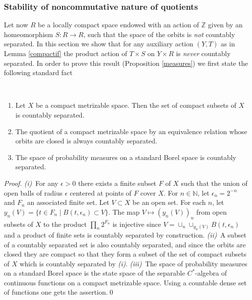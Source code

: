 \documentclass[graybox, envcountsect%
]{svmult}
\def\N{{\mathbb N}}
\def\Z{{\mathbb Z}}
\begin{document}
\subsubsection{Stability of noncommutative nature of quotients} \label{subsubsec:2.1.2}

Let now $R$ be a locally compact space endowed with an action of $\Z$ given by an homeomorphism $S:R\to R$, such that the space of the orbits is \emph{not} countably separated. In this section we show that for any  auxiliary action $(Y,T)$ as in Lemma \ref{compactif}   the product action of $T\times S$ on $Y\times R$ is \emph{never} countably separated.  
In order to prove this result (Proposition \ref{measures}) we first state the following standard fact
 
 \begin{lemma}\label{compactsep} \ \begin{enumerate}\item[(i)] Let $X$ be a compact metrizable space. Then the set of compact subsets of $X$ is countably separated. 
 \item[(ii)] The quotient of a compact metrizable space by an equivalence relation whose orbits are closed is always countably separated.
 \item[(iii)] The space of probability measures on a standard Borel space is countably separated.
 \end{enumerate}
 \end{lemma}
 \begin{proof} {\it (i)}~For any $\epsilon>0$ there exists a finite subset $F$ of $X$ such that the union of open  balls of radius $\epsilon$ centered at points of $F$ cover $X$. For $n\in\N$, let $\epsilon_n=2^{-n}$ and $F_n$ an associated finite set. Let $V\subset X$ be an open set. For each $n$, let $y_n(V)=\{t\in F_n\mid B(t,\epsilon_n)\subset V\}$. The map $V\mapsto (y_n(V))_n$ from open subsets of $X$ to the product $\prod_n 2^{F_n}$ is injective since 
 $V=\cup_n\cup_{y_n(V)}B(t,\epsilon_n)$ and a product of finite sets is countably separated by construction.\newline
 {\it (ii)}~A subset of a countably separated set is also countably separated, and since the orbits are closed they are compact so that they form a subset of the set of compact subsets of $X$ which is countably separated by {\it (i)}.\newline
 {\it (iii)}~The space of probability measures on a standard Borel space is the state space of the separable $C^*$-algebra of continuous functions on a compact metrizable space. Using a countable dense set of functions one gets the assertion.\qed \end{proof} 
\end{document}
